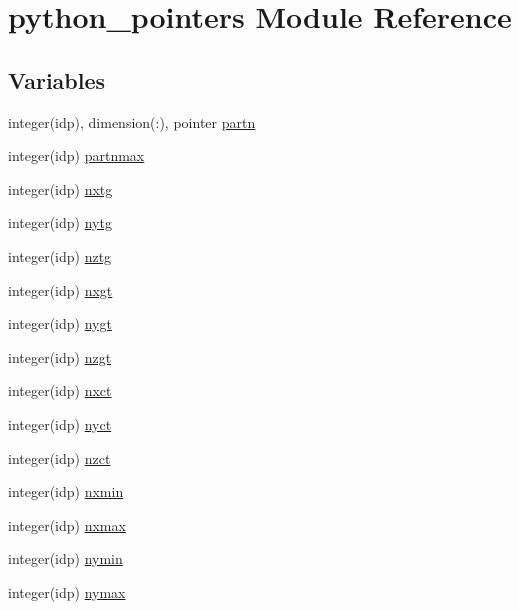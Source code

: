 \hypertarget{namespacepython__pointers}{}\section{python\+\_\+pointers Module Reference}
\label{namespacepython__pointers}
\subsection*{Variables}
\begin{DoxyCompactItemize}
\item 
integer(idp), dimension(\+:), pointer \hyperlink{namespacepython__pointers_a409a7bbbe4a92197cff88731aeb97fba}{partn}
\item 
integer(idp) \hyperlink{namespacepython__pointers_a9e83842bc27e9a1d4021ea9c0ddd0320}{partnmax}
\item 
integer(idp) \hyperlink{namespacepython__pointers_a6782a08a4b8ecdfc9b04ae74f62f30fe}{nxtg}
\item 
integer(idp) \hyperlink{namespacepython__pointers_adee3650ff1605023328d78c974995de9}{nytg}
\item 
integer(idp) \hyperlink{namespacepython__pointers_a46103f36ebf9246b4fb558d8ceaee49d}{nztg}
\item 
integer(idp) \hyperlink{namespacepython__pointers_ae4f4f06a80f2084571ee0a1f4b3348c3}{nxgt}
\item 
integer(idp) \hyperlink{namespacepython__pointers_a244755ce8318f2ada30b4163ed6daa0b}{nygt}
\item 
integer(idp) \hyperlink{namespacepython__pointers_a69e8ac761b1c3caaf7bf2d9a67913963}{nzgt}
\item 
integer(idp) \hyperlink{namespacepython__pointers_a75ab930be0836b533be53654ce5e7e94}{nxct}
\item 
integer(idp) \hyperlink{namespacepython__pointers_a3c053835361f80faa80f73c6137642a5}{nyct}
\item 
integer(idp) \hyperlink{namespacepython__pointers_ae97e07344d71818baae6eed1845e70d6}{nzct}
\item 
integer(idp) \hyperlink{namespacepython__pointers_a7354ad2c641955bc8b9dfed923d3131f}{nxmin}
\item 
integer(idp) \hyperlink{namespacepython__pointers_a430f791c79026fff09c2ba1b34826ca4}{nxmax}
\item 
integer(idp) \hyperlink{namespacepython__pointers_a56cf20a0f24cba392394189aa38886da}{nymin}
\item 
integer(idp) \hyperlink{namespacepython__pointers_a02ace0f573d69c7a02c31b96704a81bf}{nymax}

\end{DoxyCompactItemize}
